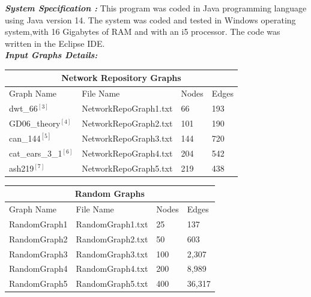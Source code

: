 \documentclass{article}
\begin{document}
\textit{\textbf{System Specification : }}
This program was coded in Java programming language using Java version 14.
The system was coded and tested in Windows operating system,with 16 Gigabytes of RAM and with an i5 processor.
The code was written in the Eclipse IDE. \\
\newpage
\textit{\textbf{Input Graphs Details: }}

\begin{center}
 \begin{tabular}{||p{3cm} | p{4cm} | p{2cm}|p{2cm} ||} 
\hline
\multicolumn{4}{|c|}{Network Repository Graphs} \\

 \hline

 Graph Name& File Name & Nodes & Edges \\ [0.5ex] 
 \hline\hline
 dwt\_66$^{[3]}$ &NetworkRepoGraph1.txt & 66 &193  \\ 
 \hline
 GD06\_theory$^{[4]}$&NetworkRepoGraph2.txt  & 101 & 190\\
 \hline
can\_144$^{[5]}$ &NetworkRepoGraph3.txt  & 144 & 720 \\
 \hline
 cat\_ears\_3\_1$^{[6]}$&NetworkRepoGraph4.txt & 204 & 542\\
 \hline
  ash219$^{[7]}$&NetworkRepoGraph5.txt  & 219 &438\\ [1ex] 
 \hline
\end{tabular}
\end{center}

\begin{center}
 \begin{tabular}{||p{3cm} | p{4cm} | p{2cm}|p{2cm} ||} 
\hline
\multicolumn{4}{|c|}{Random Graphs} \\

 \hline

 Graph Name& File Name & Nodes & Edges \\ [0.5ex] 
 \hline\hline
 RandomGraph1 &RandomGraph1.txt & 25 & 137  \\ 
 \hline
 RandomGraph2 & RandomGraph2.txt  & 50 & 603 \\
 \hline
RandomGraph3 & RandomGraph3.txt  & 100 & 2,307 \\
 \hline
 RandomGraph4 & RandomGraph4.txt & 200 & 8,989\\
 \hline
RandomGraph5 & RandomGraph5.txt  & 400 & 36,317\\ [1ex] 
 \hline
\end{tabular}
\end{center}

\end{document}
